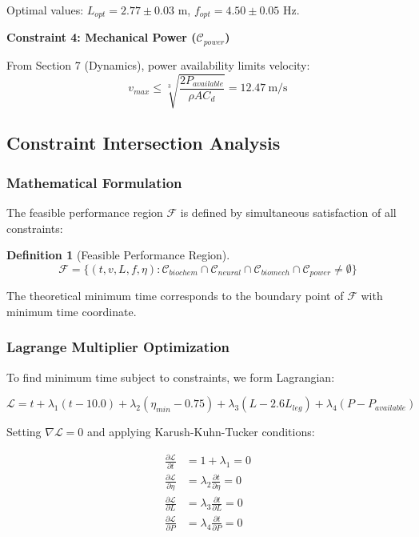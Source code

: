 \documentclass[10pt]{article}
\newtheorem{definition}{Definition}
\begin{document}
Optimal values: $L_{opt} = 2.77 \pm 0.03$ m, $f_{opt} = 4.50 \pm 0.05$ Hz.

\textbf{Constraint 4: Mechanical Power ($\mathcal{C}_{power}$)}

From Section 7 (Dynamics), power availability limits velocity:
\begin{equation}
v_{max} \leq \sqrt[3]{\frac{2P_{available}}{\rho A C_d}} = 12.47~\text{m/s}
\label{eq:C4_power}
\end{equation}

\subsection{Constraint Intersection Analysis}

\subsubsection{Mathematical Formulation}

The feasible performance region $\mathcal{F}$ is defined by simultaneous satisfaction of all constraints:

\begin{definition}[Feasible Performance Region]
\begin{equation}
\mathcal{F} = \{(t, v, L, f, \eta) : \mathcal{C}_{biochem} \cap \mathcal{C}_{neural} \cap \mathcal{C}_{biomech} \cap \mathcal{C}_{power} \neq \emptyset\}
\label{eq:feasible_region}
\end{equation}
\end{definition}

The theoretical minimum time corresponds to the boundary point of $\mathcal{F}$ with minimum time coordinate.

\subsubsection{Lagrange Multiplier Optimization}

To find minimum time subject to constraints, we form Lagrangian:

\begin{equation}
\mathcal{L} = t + \lambda_1(t - 10.0) + \lambda_2(\eta_{min} - 0.75) + \lambda_3(L - 2.6L_{leg}) + \lambda_4(P - P_{available})
\label{eq:lagrangian}
\end{equation}

Setting $\nabla \mathcal{L} = 0$ and applying Karush-Kuhn-Tucker conditions:

\begin{align}
\frac{\partial \mathcal{L}}{\partial t} &= 1 + \lambda_1 = 0 \\
\frac{\partial \mathcal{L}}{\partial \eta} &= \lambda_2 \frac{\partial t}{\partial \eta} = 0 \\
\frac{\partial \mathcal{L}}{\partial L} &= \lambda_3 \frac{\partial t}{\partial L} = 0 \\
\frac{\partial \mathcal{L}}{\partial P} &= \lambda_4 \frac{\partial t}{\partial P} = 0
\end{align}
\end{document}
